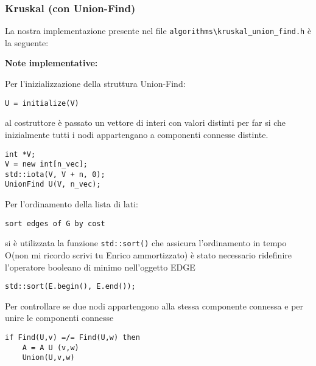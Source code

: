 \documentclass[]{article}
\begin{document}
\subsubsection{Kruskal (con Union-Find)}
\begin{flushleft}
La nostra implementazione presente nel file \verb|algorithms\kruskal_union_find.h| è la seguente:

\lstset{language=c++, style=mystyle}


\textbf{Note implementative:}

\medskip
Per l'inizializzazione della struttura Union-Find:

\begin{lstlisting}
U = initialize(V)
\end{lstlisting}

\smallskip
al costruttore è passato un vettore di interi con valori distinti per far si che inizialmente tutti i nodi appartengano a componenti connesse distinte.

\lstset{language=c++, style=mystyle, firstnumber=3}  	 	
\begin{lstlisting}
int *V;
V = new int[n_vec];
std::iota(V, V + n, 0);
UnionFind U(V, n_vec);
\end{lstlisting}

\medskip
Per l'ordinamento della lista di lati:

\begin{lstlisting}
sort edges of G by cost
\end{lstlisting}

\smallskip
si è utilizzata la funzione \verb|std::sort()| che assicura l'ordinamento in tempo O(non mi ricordo scrivi tu Enrico ammortizzato)%
 è stato necessario ridefinire l'operatore booleano di minimo nell'oggetto EDGE
 
\lstset{language=c++, style=mystyle, firstnumber=7} 	 	
\begin{lstlisting}
std::sort(E.begin(), E.end());
\end{lstlisting}

\medskip
Per controllare se due nodi appartengono alla stessa componente connessa e per unire le componenti connesse
\begin{lstlisting}
if Find(U,v) =/= Find(U,w) then
	A = A U (v,w)
	Union(U,v,w)
\end{lstlisting}


\end{flushleft}
\end{document}
